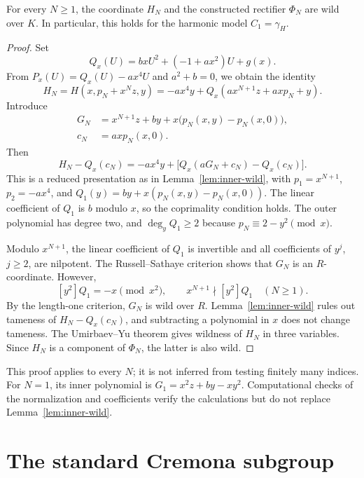 \begin{proposition}
\label{prop:family-wild}
For every $N\ge1$, the coordinate $H_N$ and the constructed rectifier
$\Phi_N$ are wild over $K$. In particular, this holds for the harmonic
model $C_1=\gamma_H$.
\end{proposition}
\begin{proof}
Set
\[
 Q_x(U)=bxU^2+(-1+ax^2)U+g(x).
\]
From $P_x(U)=Q_x(U)-ax^4U$ and $a^2+b=0$, we obtain the identity
\[
 H_N=H(x,p_N+x^Nz,y)
     =-ax^4y+Q_x(ax^{N+1}z+axp_N+y).
\]
Introduce
\[
 \begin{aligned}
 G_N&=x^{N+1}z+by+x\bigl(p_N(x,y)-p_N(x,0)\bigr),\\
 c_N&=axp_N(x,0).
 \end{aligned}
\]
Then
\begin{equation}\label{eq:family-reduced}
 H_N-Q_x(c_N)
 =-ax^4y+\bigl[Q_x(aG_N+c_N)-Q_x(c_N)\bigr].
\end{equation}
This is a reduced presentation as in Lemma~\ref{lem:inner-wild}, with
$p_1=x^{N+1}$, $p_2=-ax^4$, and
$Q_1(y)=by+x(p_N(x,y)-p_N(x,0))$.
The linear coefficient of $Q_1$ is $b$ modulo $x$, so the coprimality
condition holds. The outer polynomial has degree two, and
$\deg_yQ_1\ge2$ because $p_N\equiv2-y^2\pmod x$.

Modulo $x^{N+1}$, the linear coefficient of $Q_1$ is invertible and all
coefficients of $y^j$, $j\ge2$, are nilpotent.
The Russell--Sathaye criterion shows that $G_N$ is an $R$-coordinate.
However,
\[
 [y^2]Q_1=-x\pmod{x^2},\qquad
 x^{N+1}\nmid[y^2]Q_1\quad(N\ge1).
\]
By the length-one criterion, $G_N$ is wild over $R$.
Lemma~\ref{lem:inner-wild} rules out tameness of $H_N-Q_x(c_N)$,
and subtracting a polynomial in $x$ does not change tameness.
The Umirbaev--Yu theorem gives wildness of $H_N$ in three variables.
Since $H_N$ is a component of $\Phi_N$, the latter is also wild.
\end{proof}

This proof applies to every $N$; it is not inferred from testing finitely
many indices. For $N=1$, its inner polynomial is
$G_1=x^2z+by-xy^2$. Computational checks of the normalization and
coefficients verify the calculations but do not replace
Lemma~\ref{lem:inner-wild}.

\section{The standard Cremona subgroup}\label{sec:standard-subgroup}

